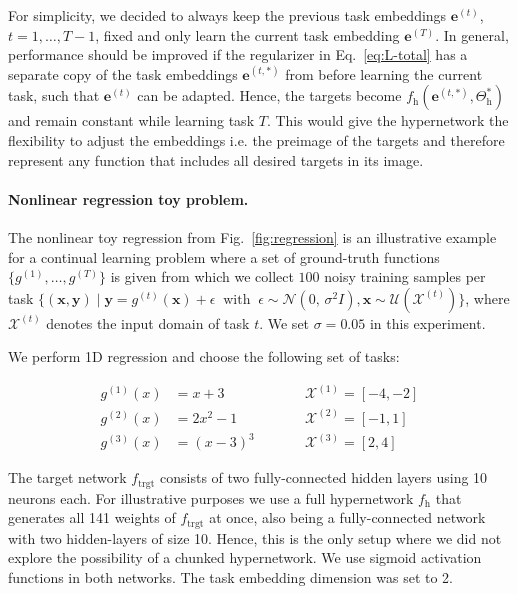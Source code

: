 \documentclass{article}
\begin{document}
For simplicity, we decided to always keep the previous task embeddings $\mathbf{e}^{(t)}$, $t = 1, \dots, T-1$, fixed and only learn the current task embedding $\mathbf{e}^{(T)}$. In general, performance should be improved if the regularizer in Eq.~\ref{eq:L-total} has a separate copy of the task embeddings $\mathbf{e}^{(t, *)}$ from before learning the current task, such that $\mathbf{e}^{(t)}$ can be adapted. Hence, the targets become $f_\text{h}(\mathbf{e}^{(t, *)}, \Theta_\text{h}^*)$ and remain constant while learning task $T$. This would give the hypernetwork the flexibility to adjust the embeddings i.e. the preimage of the targets and therefore represent any function that includes all desired targets in its image.

\paragraph{Nonlinear regression toy problem.}

The nonlinear toy regression from Fig.~\ref{fig:regression} is an illustrative example for a continual learning problem where a set of ground-truth functions $\{ g^{(1)}, \dots, g^{(T)} \}$ is given from which we collect $100$ noisy training samples per task $\{ (\mathbf{x}, \mathbf{y}) \mid \mathbf{y} = g^{(t)}(\mathbf{x}) + \epsilon \ \text{ with } \ \epsilon \sim \mathcal{N}(0,\, \sigma^2 I), \mathbf{x} \sim \mathcal{U}(\mathcal{X}^{(t)}) \}$, where $\mathcal{X}^{(t)}$ denotes the input domain of task $t$. We set $\sigma = 0.05$ in this experiment. 

We perform 1D regression and choose the following set of tasks:

\begin{align}
    g^{(1)}(x) &= x + 3   & \qquad & \mathcal{X}^{(1)} = [-4, -2] \\
    g^{(2)}(x) &= 2x^2 -1 & \qquad & \mathcal{X}^{(2)} = [-1, 1] \\
    g^{(3)}(x) &= (x-3)^3 & \qquad & \mathcal{X}^{(3)} = [2, 4]
\end{align}

The target network $f_\text{trgt}$ consists of two fully-connected hidden layers using 10 neurons each. For illustrative purposes we use a full hypernetwork $f_\text{h}$ that generates all 141 weights of $f_\text{trgt}$ at once, also being a fully-connected network with two hidden-layers of size 10. Hence, this is the only setup where we did not explore the possibility of a chunked hypernetwork. We use sigmoid activation functions in both networks. The task embedding dimension was set to 2.
\end{document}
